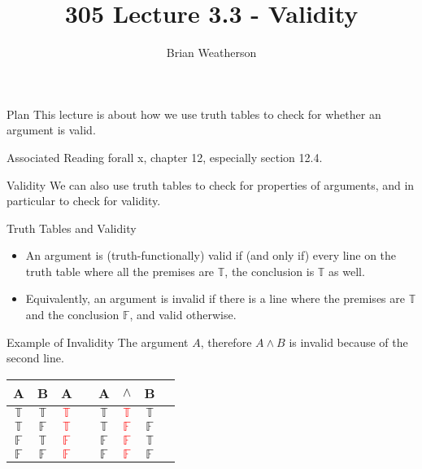 \documentclass[
  ignorenonframetext,
]{beamer}
\title{305 Lecture 3.3 - Validity}
\author{Brian Weatherson}
\date{}
\providecommand{\tightlist}{%
  \setlength{\itemsep}{0pt}\setlength{\parskip}{0pt}}
\renewcommand{\,}{\text{, }}
\def\True{\mathbb{T}}
\def\False{\mathbb{F}}
\begin{document}
\frame{\titlepage}

\begin{frame}{Plan}
\protect\hypertarget{plan}{}
This lecture is about how we use truth tables to check for whether an
argument is valid.
\end{frame}

\begin{frame}{Associated Reading}
\protect\hypertarget{associated-reading}{}
forall x, chapter 12, especially section 12.4.
\end{frame}

\begin{frame}{Validity}
\protect\hypertarget{validity}{}
We can also use truth tables to check for properties of arguments, and
in particular to check for validity.
\end{frame}

\begin{frame}{Truth Tables and Validity}
\protect\hypertarget{truth-tables-and-validity}{}
\begin{itemize}[<+->]
\tightlist
\item
  An argument is (truth-functionally) valid if (and only if) every line
  on the truth table where all the premises are \(\True\), the
  conclusion is \(\True\) as well.
\item
  Equivalently, an argument is invalid if there is a line where the
  premises are \(\True\) and the conclusion \(\False\), and valid
  otherwise.
\end{itemize}
\end{frame}

\begin{frame}{Example of Invalidity}
\protect\hypertarget{example-of-invalidity}{}
The argument \(A\), therefore \(A \wedge B\) is invalid because of the
second line.

\begin{center}

\begin{tabular}{@{ }c@{ }@{ }c | c | c@{ }@{ }c@{ }@{ }c@{ }@{ }c@{ }@{ }c}
A & B & A &  & A & $\wedge$ & B & \\
\hline 
$\True$ & $\True$ & \textcolor{red}{$\True$} &  & $\True$ & \textcolor{red}{$\True$} & $\True$ & \\
$\True$ & $\False$ & \textcolor{red}{$\True$} &  & $\True$ & \textcolor{red}{$\False$} & $\False$ & \\
$\False$ & $\True$ & \textcolor{red}{$\False$} &  & $\False$ & \textcolor{red}{$\False$} & $\True$ & \\
$\False$ & $\False$ & \textcolor{red}{$\False$} &  & $\False$ & \textcolor{red}{$\False$} & $\False$ & \\
\end{tabular}
\end{center}
\end{frame}
\end{document}
